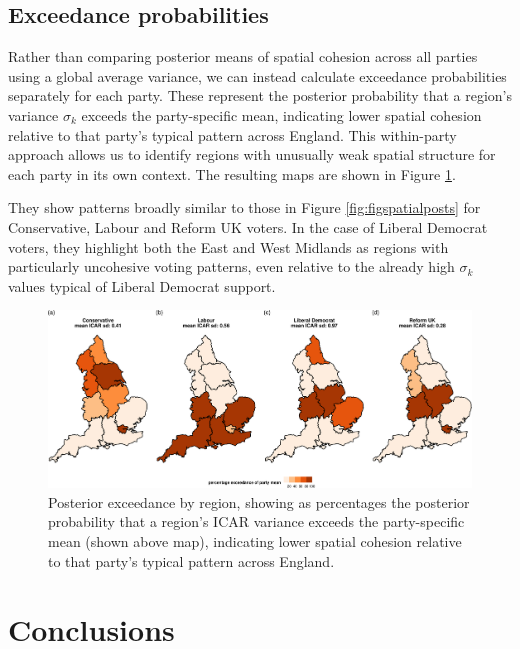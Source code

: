 \documentclass[webpdf,large,contemporary,namedate]{oup-authoring-template}
\theoremstyle{thmstyleone}
\theoremstyle{thmstyletwo}
\theoremstyle{thmstylethree}
\begin{document}
\subsection{Exceedance probabilities}\label{exceedance-probabilities}

Rather than comparing posterior means of spatial cohesion across all
parties using a global average variance, we can instead calculate
exceedance probabilities \citep{Richardson2004} separately for each
party. These represent the posterior probability that a region's
variance \(\sigma_k\) exceeds the party-specific mean, indicating lower
spatial cohesion relative to that party's typical pattern across
England. This within-party approach allows us to identify regions with
unusually weak spatial structure for each party in its own context. The
resulting maps are shown in Figure \ref{fig:figexceedances}.

They show patterns broadly similar to those in Figure
\ref{fig:figspatialposts} for Conservative, Labour and Reform UK voters.
In the case of Liberal Democrat voters, they highlight both the East and
West Midlands as regions with particularly uncohesive voting patterns,
even relative to the already high \(\sigma_k\) values typical of Liberal
Democrat support.

\begin{figure}[th]
\includegraphics[width=1\linewidth]{jrss_resubmission3_files/figure-latex/figexceedances-1} \caption{Posterior exceedance by region, showing as percentages the posterior probability that a region’s ICAR variance exceeds the party-specific mean (shown above map), indicating lower spatial cohesion relative to that party’s typical pattern across England.}\label{fig:figexceedances}
\end{figure}

\section{Conclusions}\label{conclusions}
\end{document}
